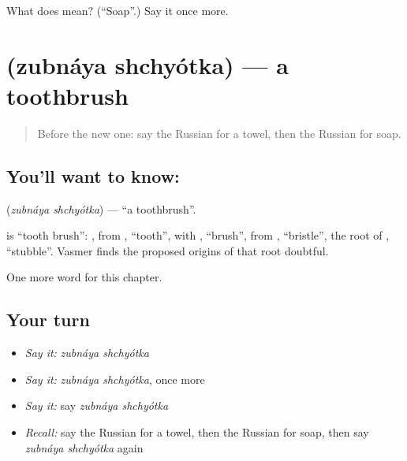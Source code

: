 \begin{tcolorbox}[breakable,colback=teal!4,colframe=teal!35!black,title={Before you move on}]
What does  mean? (\textquotedblleft{}Soap\textquotedblright{}.) Say it once more.
\end{tcolorbox}
\section[\texorpdfstring{\ru{зубная} \ru{щётка} (zubnáya shchyótka)}{зубная щётка (zubnáya shchyótka)}]{  (zubnáya shchyótka) — a toothbrush}

\label{lesson:RU-C96-toothbrush}



\begin{quote}
Before the new one: say the Russian for a towel, then the Russian for soap.
\end{quote}

\subsection*{You'll want to know:  }
\textbf{ } (\emph{zubnáya shchyótka}) — \textquotedblleft{}a toothbrush\textquotedblright{}.

\begin{cousinweb}
\textbf{ } is \textquotedblleft{}tooth brush\textquotedblright{}: \emph{}, from \emph{}, \textquotedblleft{}tooth\textquotedblright{}, with \emph{}, \textquotedblleft{}brush\textquotedblright{}, from \emph{}, \textquotedblleft{}bristle\textquotedblright{}, the root of \emph{}, \textquotedblleft{}stubble\textquotedblright{}. Vasmer finds the proposed origins of that root doubtful.
\end{cousinweb}

\begin{grammarlens}[title={What you've built}]
One more word for this chapter.
\end{grammarlens}

\subsection*{Your turn}
\begin{itemize}
\raggedright
  \item \emph{Say it:} \emph{zubnáya shchyótka}
  \item \emph{Say it:} \emph{zubnáya shchyótka}, once more
  \item \emph{Say it:} say \emph{zubnáya shchyótka}
  \item \emph{Recall:} say the Russian for a towel, then the Russian for soap, then say \emph{zubnáya shchyótka} again
\end{itemize}

